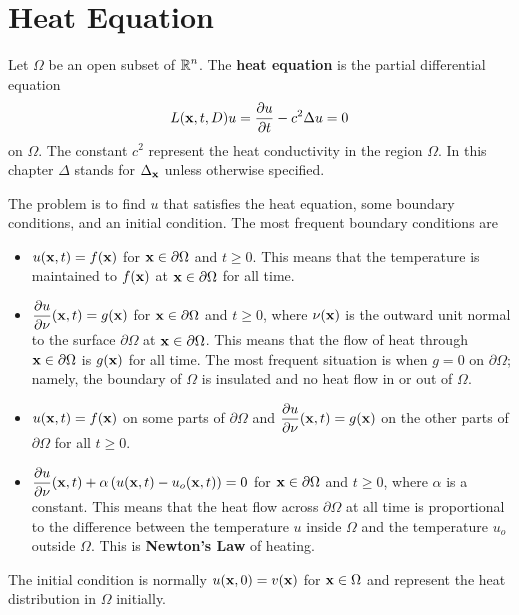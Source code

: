 \chapter{Heat Equation} \label{ChapHeatEqu}

Let $\Omega$ be an open subset of $\displaystyle \mathbb{R}^n$.  The
{\bfseries heat equation}
is the partial differential equation
\[
L(\mathbf{x},t,D) u = \frac{\partial{u}}{\partial t} - c^2 \Delta u = 0
\]
on $\Omega$.  The constant $\displaystyle c^2$ represent the heat
conductivity in the region $\Omega$.  In this chapter $\Delta$ stands for
$\Delta_{\mathbf{x}}$ unless otherwise specified.

The problem is to find $u$ that satisfies the heat equation, some
boundary conditions, and an initial condition.  The most frequent
boundary conditions are
\begin{itemize}
\item $u(\mathbf{x},t)=f(\mathbf{x})$ for $\mathbf{x} \in \partial \Omega$ and
$t\geq 0$.  This means that the temperature is maintained to
$f(\mathbf{x})$ at $\mathbf{x} \in \partial \Omega$ for all time.
\item $\displaystyle \frac{\partial{u}}{\partial \mathbf{\nu}}(\mathbf{x},t) = g(\mathbf{x})$ for
$\mathbf{x} \in \partial \Omega$ and $t\geq 0$, where $\mathbf{\nu}(\mathbf{x})$
is the outward unit normal to the surface $\partial \Omega$ at
$\mathbf{x}\in \partial \Omega$.  This means that the flow of heat
through $\mathbf{x} \in \partial \Omega$ is $g(\mathbf{x})$ for all time.
The most frequent situation is when $g=0$ on $\partial \Omega$;
namely, the boundary of $\Omega$ is insulated and no heat flow in or
out of $\Omega$.
\item $u(\mathbf{x},t)=f(\mathbf{x})$ on some parts of $\partial \Omega$ and
$\displaystyle \frac{\partial{u}}{\partial \mathbf{\nu}}(\mathbf{x},t) = g(\mathbf{x})$ on the
other parts of $\partial \Omega$ for all $t\geq 0$.
\item $\displaystyle \frac{\partial{u}}{\partial \mathbf{\nu}}(\mathbf{x},t) + \alpha \left(
u(\mathbf{x},t) - u_o(\mathbf{x},t)\right) = 0$ for
$\mathbf{x} \in \partial \Omega$ and $t\geq 0$,
where $\alpha$ is a constant.  This means that the heat flow
across $\partial \Omega$ at all time is proportional to the difference
between the temperature $u$ inside $\Omega$ and the temperature $u_o$
outside $\Omega$.  This is
{\bfseries Newton's Law} of heating.
\end{itemize}
The initial condition is normally $u(\mathbf{x},0) = v(\mathbf{x})$ for
$\mathbf{x} \in \Omega$ and represent the heat distribution in $\Omega$
initially.

